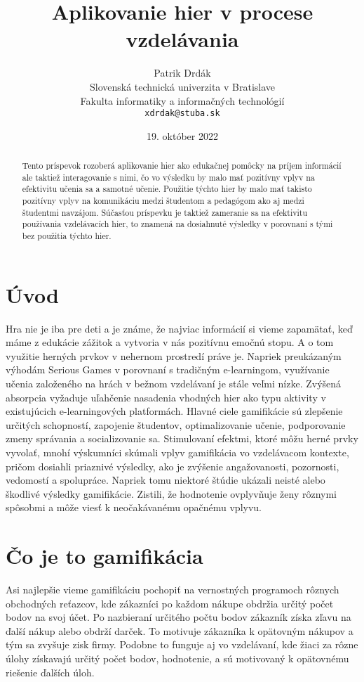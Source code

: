 \documentclass[10pt,twoside,slovak,a4paper]{article}
\title{Aplikovanie hier v procese vzdelávania
} %
\author{Patrik Drdák\\[2pt]
	{\small Slovenská technická univerzita v Bratislave}\\
	{\small Fakulta informatiky a informačných technológií}\\
	{\small \texttt{xdrdak@stuba.sk}}
	}
\date{\small 19. október 2022} %
\begin{document}
\maketitle

\begin{abstract}
Tento príspevok rozoberá aplikovanie hier
ako edukačnej pomôcky na príjem informácií ale taktiež interagovanie s nimi,
čo vo výsledku by malo mať pozitívny vplyv na efektivitu učenia sa a samotné
učenie. Použitie týchto hier by malo mať takisto pozitívny vplyv na komunikáciu medzi študentom a pedagógom ako aj medzi študentmi navzájom. Súčasťou príspevku je taktiež zameranie sa na efektivitu používania vzdelávacích hier, to znamená na dosiahnuté výsledky v porovnaní s tými bez použitia týchto hier.

\end{abstract}



\section{Úvod}

Hra nie je iba pre deti a je známe, že najviac informácií si vieme zapamätať, keď máme z edukácie zážitok a vytvoria v nás pozitívnu emočnú stopu. A o tom využitie herných prvkov v nehernom prostredí práve je. Napriek preukázaným výhodám Serious Games v porovnaní s tradičným e-learningom, využívanie učenia založeného na hrách
v bežnom vzdelávaní je stále veľmi nízke. Zvýšená absorpcia
vyžaduje uľahčenie nasadenia vhodných hier ako typu aktivity
v existujúcich e-learningových platformách. Hlavné ciele gamifikácie sú zlepšenie určitých schopností, zapojenie študentov, optimalizovanie učenie, podporovanie zmeny správania a socializovanie sa. Stimulovaní efektmi, ktoré môžu herné prvky vyvolať, mnohí výskumníci skúmali vplyv gamifikácia vo vzdelávacom kontexte, pričom dosiahli priaznivé výsledky, ako je zvýšenie angažovanosti, pozornosti, vedomostí a spolupráce. Napriek tomu niektoré štúdie ukázali neisté alebo škodlivé výsledky gamifikácie. Zistili, že hodnotenie ovplyvňuje ženy rôznymi spôsobmi a môže viesť k neočakávanému opačnému vplyvu.

\section{Čo je to gamifikácia}
Asi najlepšie vieme gamifikáciu pochopiť na vernostných programoch rôznych obchodných reťazcov, kde zákazníci po každom nákupe obdržia určitý počet bodov na svoj účet.\cite{jakub} Po nazbieraní určitého počtu bodov zákazník získa zľavu na ďalší nákup alebo obdrží darček. To motivuje zákazníka k opätovným nákupov a tým sa zvyšuje zisk firmy. Podobne to funguje aj vo vzdelávaní, kde žiaci za rôzne úlohy získavajú určitý počet bodov, hodnotenie, a sú motivovaný k opätovnému riešenie ďalších úloh. 
\end{document}
